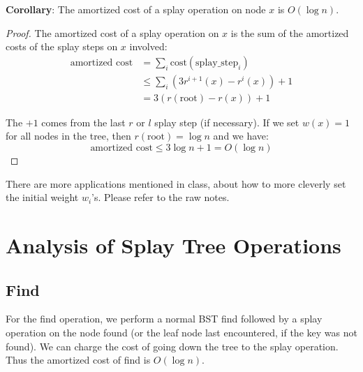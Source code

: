 \documentclass{article}
\begin{document}
\textbf{Corollary}:
The amortized cost of a splay operation on node $x$ is $O(\log n)$.

\begin{proof}

The amortized cost of a splay operation on $x$ is the sum of the
amortized costs of the splay steps on $x$ involved:
\begin{align*}
  \textrm{amortized cost} & = \sum_{i}
    \textrm{cost}(\textrm{splay\_step}_{i}) \\
  & \le \sum_{i} \left(3r^{i + 1}(x) - r^{i}(x)\right) + 1 \\
  & = 3(r(\textrm{root}) - r(x)) + 1
\end{align*}

The $+ 1$ comes from the last $r$ or $l$ splay step (if necessary).
If we set $w(x) = 1$ for all nodes in the tree, then
$r(\textrm{root}) = \log n$ and we have:
$$\textrm{amortized cost} \le 3\log n + 1 = O(\log n)$$
\end{proof}

There are more applications mentioned in class, about how to more cleverly set the initial weight $w_i$'s. Please refer to the raw notes.

\section{Analysis of Splay Tree Operations}

\subsection{Find}
For the find operation, we perform a normal BST find followed by a
splay operation on the node found (or the leaf node last encountered,
if the key was not found). We can charge the cost of going down the
tree to the splay operation. Thus the amortized cost of find is
$O(\log n)$.
\end{document}
